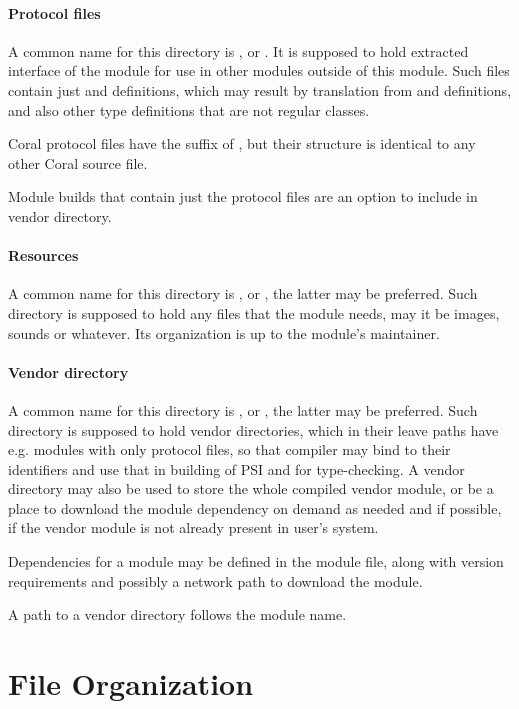 \paragraph{Protocol files}
A common name for this directory is , or . It is supposed to hold extracted interface of the module for use in other modules outside of this module. Such files contain just  and  definitions, which may result by translation from  and  definitions, and also other type definitions that are not regular classes. 

Coral protocol files have the suffix of , but their structure is identical to any other Coral source file. 

Module builds that contain just the protocol files are an option to include in vendor directory. 

\paragraph{Resources}
A common name for this directory is , or , the latter may be preferred. Such directory is supposed to hold any files that the module needs, may it be images, sounds or whatever. Its organization is up to the module's maintainer. 

\paragraph{Vendor directory}
A common name for this directory is , or , the latter may be preferred. Such directory is supposed to hold vendor directories, which in their leave paths have e.g. modules with only protocol files, so that compiler may bind to their identifiers and use that in building of PSI and for type-checking. A vendor directory may also be used to store the whole compiled vendor module, or be a place to download the module dependency on demand as needed and if possible, if the vendor module is not already present in user's system. 

Dependencies for a module may be defined in the module file, along with version requirements and possibly a network path to download the module. 

A path to a vendor directory follows the module name. 





\section{File Organization}

